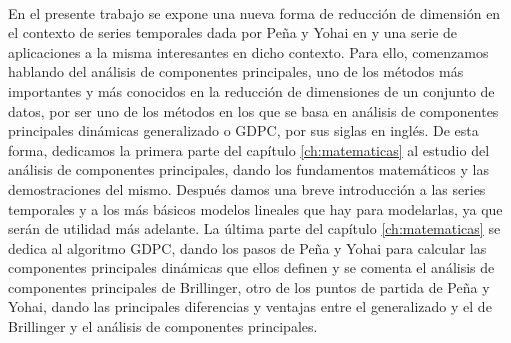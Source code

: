 \chapter*{}






\cleardoublepage
\thispagestyle{empty}

\begin{center}
{\large\bfseries \myTitle }\\
\end{center}
\begin{center}	
	\myName \\
\end{center}

\\

\vspace{0.7cm}
\\

En el presente trabajo se expone una nueva forma de reducción de dimensión en el contexto de series temporales dada por Peña y Yohai en \cite{pena16} y una serie de aplicaciones a la misma interesantes en dicho contexto. Para ello, comenzamos hablando del análisis de componentes principales, uno de los métodos más importantes y más conocidos en la reducción de dimensiones de un conjunto de datos, por ser uno de los métodos en los que se basa en análisis de componentes principales dinámicas generalizado o GDPC, por sus siglas en inglés. De esta forma, dedicamos la primera parte del capítulo \ref{ch:matematicas} al estudio del análisis de componentes principales, dando los fundamentos matemáticos y las demostraciones del mismo. Después damos una breve introducción a las series temporales y a los más básicos modelos lineales que hay para modelarlas, ya que serán de utilidad más adelante. La última parte del capítulo \ref{ch:matematicas} se dedica al algoritmo GDPC, dando los pasos de Peña y Yohai para calcular las componentes principales dinámicas que ellos definen y se comenta el análisis de componentes principales de Brillinger, otro de los puntos de partida de Peña y Yohai, dando las principales diferencias y ventajas entre el generalizado y el de Brillinger y el análisis de componentes principales.\\

